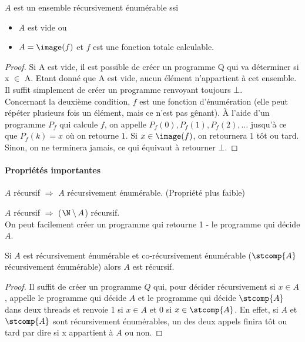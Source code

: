 \begin{myprop}
	$A$ est un ensemble récursivement énumérable ssi
    \begin{itemize}
      \item $A$ est vide ou
      \item $A = \image(f)$ et $f$ est une fonction totale calculable.
    \end{itemize}

    \begin{proof}
      Si A est vide, il est possible de créer un programme Q qui va déterminer si x $\in$ A. Etant donné que A est vide, aucun élément n'appartient à cet ensemble. Il suffit simplement de créer un programme renvoyant toujours $\bot$. \\
      Concernant la deuxième condition, $f$ est une fonction d'énumération (elle peut répéter plusieurs fois un élément, mais ce n'est pas gênant).
      À l'aide d'un programme $P_f$ qui calcule $f$,
      on appelle $P_f(0), P_f(1), P_f(2), \ldots$
      jusqu'à ce que $P_f(k) = x$ où on retourne $1$.
      Si $x \in \image(f)$, on retournera $1$ tôt ou tard.
      Sinon, on ne terminera jamais, ce qui équivaut à retourner $\bot$.
    \end{proof}
\end{myprop}


\paragraph{Propriétés importantes}
\label{par:propri_t_s_importantes}
\begin{myprop}
	$A$ récursif $\Rightarrow$ $A$ récursivement énumérable. (Propriété plus
		faible)
\end{myprop}

\begin{myprop}
	$A$ récursif $\Rightarrow$ ($\N \setminus A$) récursif.\\ On peut facilement créer
		un programme qui retourne 1 - le programme qui décide $A$.
\end{myprop}

\begin{myprop}
    Si $A$ est récursivement énumérable et co-récursivement énumérable ($\stcomp{A}$ récursivement énumérable)
    alors $A$ est récursif.
    \begin{proof}
      Il suffit de créer un programme $Q$ qui, pour décider récursivement si $x \in A$, appelle le programme qui décide $A$ et le programme qui décide $\stcomp{A}$ dans deux threads et renvoie 1 si $x \in A$ et 0 si $x \in \stcomp{A}$. En effet, si $A$ et $\stcomp{A}$ sont récursivement énumérables, un des deux appels finira tôt ou tard par dire si x appartient à $A$ ou non.
    \end{proof}
\end{myprop}

